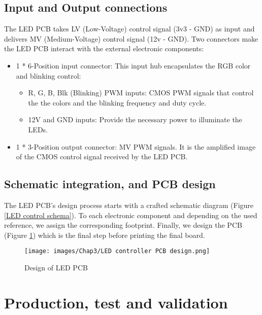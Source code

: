  \subsection{Input and Output connections}

The LED PCB takes LV (Low-Voltage) control signal (3v3 - GND) as input and delivers MV (Medium-Voltage) control signal (12v - GND). Two connectors make the LED PCB interact with the external electronic components:

 \begin{itemize}
     \item 1 * 6-Position input connector: This input hub encapsulates the RGB color and blinking control:
    \begin{itemize}
        \item R, G, B, Blk (Blinking) PWM inputs: CMOS PWM signals that control the the colors and the blinking frequency and duty cycle.
        \item 12V and GND inputs: Provide the necessary power to illuminate the LEDs.
    \end{itemize}  
    \item 1 * 3-Position output connector: MV PWM signals. It is the amplified image of the CMOS control signal received by the LED PCB.
 \end{itemize}

\subsection{Schematic integration, and PCB design}

The LED PCB's design process starts with a crafted schematic diagram (Figure \ref{LED control schema}). To each electronic component and depending on the used reference, we assign the corresponding footprint. Finally, we design the PCB (Figure \ref{LED PCB design}) which is the final step before printing the final board.

\begin{figure}[H]
\begin{center}
\texttt{[image: images/Chap3/LED controller PCB design.png]}\\
\caption{Design of LED PCB}
\label{LED PCB design}
\end{center}
\end{figure}


\section{Production, test and validation}

